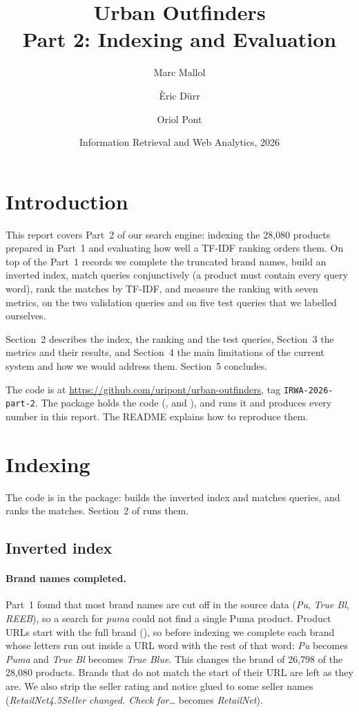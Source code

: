\documentclass[11pt,a4paper]{article}
\title{Urban Outfinders\\[0.3em]\large Part 2: Indexing and Evaluation}
\author{Marc Mallol\and Èric Dürr\and Oriol Pont}
\date{Information Retrieval and Web Analytics, 2026}
\begin{document}
\maketitle

\section{Introduction}

This report covers Part~2 of our search engine: indexing the 28{,}080 products
prepared in Part~1 and evaluating how well a TF-IDF ranking orders them. On top
of the Part~1 records we complete the truncated brand names, build an inverted
index, match queries conjunctively (a product must contain every query word),
rank the matches by TF-IDF, and measure the ranking with seven metrics, on the
two validation queries and on five test queries that we labelled ourselves.

Section~2 describes the index, the ranking and the test queries, Section~3 the
metrics and their results, and Section~4 the main limitations of the current
system and how we would address them. Section~5 concludes.

The code is at \url{https://github.com/uripont/urban-outfinders}, tag
\texttt{IRWA-2026-part-2}. The  package holds the code
(,  and ), and
 runs it and produces every number in this report.
The README explains how to reproduce them.

\section{Indexing}

The code is in the  package:  builds the
inverted index and matches queries, and  ranks the matches.
Section~2 of  runs them.

\subsection{Inverted index}

\paragraph{Brand names completed.} Part~1 found that most brand names are cut
off in the source data (\emph{Pu}, \emph{True Bl}, \emph{REEB}), so a search for
\emph{puma} could not find a single Puma product. Product URLs start with the
full brand (), so before indexing we
complete each brand whose letters run out inside a URL word with the rest of
that word: \emph{Pu} becomes \emph{Puma} and \emph{True Bl} becomes
\emph{True Blue}. This changes the brand of 26{,}798 of the 28{,}080 products.
Brands that do not match the start of their URL are left as they are. We also
strip the seller rating and notice glued to some seller names
(\emph{RetailNet4.5Seller changed. Check for\ldots} becomes \emph{RetailNet}).
\end{document}

